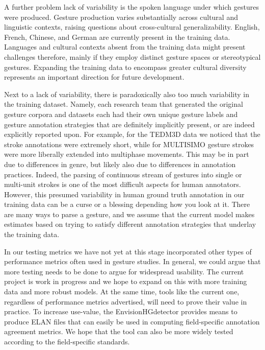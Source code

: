 \documentclass[11pt,headings=small,cleardoublepage=empty,tocflat,numbers=noenddot,twoside,captions=tableheading]{scrbook}
\begin{document}
\begin{refsection}
\begin{table}[H]
\begin{table}[H]
\begin{table}[H]
\begin{table}[H]
A further problem lack of variability is the spoken language under which gestures were produced. Gesture production varies substantially across cultural and linguistic contexts, raising questions about cross-cultural generalizability. English, French, Chinese, and German are currently present in the training data. Languages and cultural contexts absent from the training data might present challenges therefore, mainly if they employ distinct gesture spaces or stereotypical gestures. Expanding the training data to encompass greater cultural diversity represents an important direction for future development.

Next to a lack of variability, there is paradoxically also too much variability in the training dataset. Namely, each research team that generated the original gesture corpora and datasets each had their own unique gesture labels and gesture annotation strategies that are definitely implicitly present, or are indeed explicitly reported upon. For example, for the TEDM3D \parencite{rohrerTemporalPragmaticAnalysis2022} data we noticed that the stroke annotations were extremely short, while for MULTISIMO \parencite{koutsombogeraMULTISIMOMultimodalCorpus2017} gesture strokes were more liberally extended into multiphase movements. This may be in part due to differences in genre, but likely also due to differences in annotation practices. Indeed, the parsing of continuous stream of gestures into single or multi-unit strokes is one of the most difficult aspects for human annotators. However, this presumed variability in human ground truth annotation in our training data can be a curse or a blessing depending how you look at it. There are many ways to parse a gesture, and we assume that the current model makes estimates based on trying to satisfy different annotation strategies that underlay the training data. 

In our testing metrics we have not yet at this stage incorporated other types of performance metrics often used in gesture studies. In general, we could argue that more testing needs to be done to argue for widespread usability. The current project is work in progress and we hope to expand on this with more training data and more robust models. At the same time, tools like the current one, regardless of performance metrics advertised, will need to prove their value in practice. To increase use-value, the EnvisionHGdetector provides means to produce ELAN files that can easily be used in computing field-specific annotation agreement metrics. We hope that the tool can also be more widely tested according to the field-specific standards.


\end{table}
\end{table}
\end{table}
\end{table}
\end{refsection}
\end{document}
